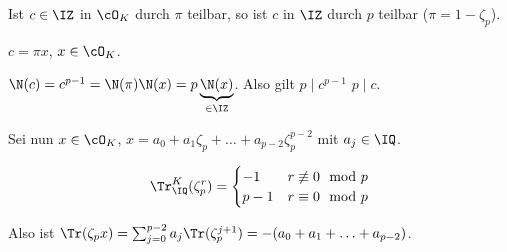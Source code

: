 \begin{Lemma}
 Ist $c\in\IZ$ in $\cO_K$ durch $\pi$ teilbar, so ist $c$ in $\IZ$ durch $p$ teilbar ($\pi=1-\zeta_p$).
\end{Lemma}

\begin{Beweis}
 $c=\pi x$, $x\in \cO_K$.
 
 $\N(c)=c^{p-1}=\N(\pi)\N(x)=p \underbrace{\N(x)}_{\in\IZ}$. Also gilt $p\mid c^{p-1}$ \folge $p\mid c$.
\end{Beweis}
 
 Sei nun $x\in \cO_K$, $x=a_0+a_1\zeta_p+ \ldots + a_{p-2} \zeta_p^{p-2}$ mit $a_j\in\IQ$.
 
 \[\Tr_\IQ^K (\zeta_p^r)=\begin{cases}
                          -1 & r \not\equiv 0 \mod{p}\\
                          p-1 & r \equiv 0 \mod{p}
                         \end{cases}
 \]
 
 Also ist $\Tr(\zeta_p x) = \sum_{j=0}^{p-2} a_j \Tr(\zeta_p^{j+1})=-(a_0+a_1+\ldots + a_{p-2})$.




 

